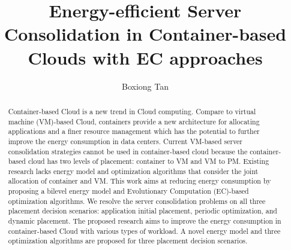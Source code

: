 \documentclass[11pt
              , a4paper
              , twoside
              , openright
              ]{report}
\title{Energy-efficient Server Consolidation in Container-based Clouds with EC approaches}
\author{Boxiong Tan}
\date{}
\begin{document}



\begin{abstract}
Container-based Cloud is a new trend in Cloud computing. Compare to virtual machine (VM)-based Cloud, containers provide a new architecture for allocating applications and a finer resource management which has the potential to further improve the energy consumption in data centers. Current VM-based server consolidation strategies cannot be used in container-based cloud because the container-based cloud has two levels of placement: container to VM and VM to PM. Existing research lacks energy model and optimization algorithms that consider the joint allocation of container and VM. This work aims at reducing energy consumption by proposing a bilevel energy model and Evolutionary Computation (EC)-based optimization algorithms. We resolve the server consolidation problems on all three placement decision scenarios: application initial placement, periodic optimization, and dynamic placement. The proposed research aims to improve the energy consumption in container-based Cloud with various types of workload. A novel energy model and three optimization algorithms are proposed for three placement decision scenarios.


\end{abstract}


\maketitle

% 

\tableofcontents



\mainmatter









\backmatter



%


\end{document}

